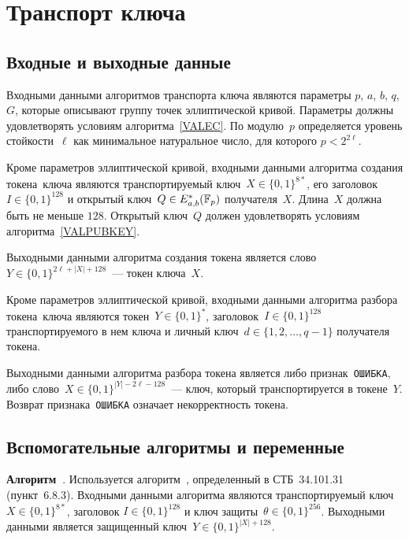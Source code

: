 \section{Транспорт ключа}\label{TRANSPORT}

\subsection{Входные и выходные данные}\label{TRANSPORT.InOut}
	
Входными данными алгоритмов транспорта ключа являются 
параметры $p$, $a$, $b$, $q$, $G$, которые описывают группу 
точек эллиптической кривой.
Параметры должны удовлетворять условиям алгоритма~\ref{VALEC}.
По модулю~$p$ определяется уровень стойкости~$\ell$ как минимальное 
натуральное число, для которого $p<2^{2\ell}$.

Кроме параметров эллиптической кривой,
входными данными алгоритма создания токена~ключа являются
транспортируемый ключ~$X\in\{0,1\}^{8*}$,
его заголовок~$I\in\{0,1\}^{128}$
и открытый ключ~$Q\in E_{a,b}^*(\mathbb{F}_p)$ получателя~$X$.
%
Длина~$X$ должна быть не меньше $128$.
%
Открытый ключ~$Q$ должен удовлетворять условиям 
алгоритма~\ref{VALPUBKEY}.

Выходными данными алгоритма создания токена является 
слово $Y\in\{0,1\}^{2\ell+|X|+128}$~--- токен ключа~$X$.

Кроме параметров эллиптической кривой,
входными данными алгоритма разбора токена~ключа являются 
токен~$Y\in\{0,1\}^*$,
заголовок~$I\in\{0,1\}^{128}$ транспортируемого в нем ключа
и личный ключ~$d\in\{1,2,\ldots,q-1\}$ получателя токена.

Выходными данными алгоритма разбора токена 
является либо признак~\texttt{ОШИБКА},
либо слово~$X\in\{0,1\}^{|Y|-2\ell-128}$~---
ключ, который транспортируется в токене~$Y$.
%
Возврат признака~\texttt{ОШИБКА} означает некорректность токена.

\subsection{Вспомогательные алгоритмы и переменные}
\label{TRANSPORT.Aux}

{\bf Алгоритм~}.
Используется алгоритм~,
определенный в СТБ~34.101.31 (пункт~6.8.3).
Входными данными алгоритма являются
транспортируемый ключ~$X\in\{0,1\}^{8*}$, заголовок $I\in\{0,1\}^{128}$
и ключ защиты~$\theta\in\{0,1\}^{256}$.
Выходными данными является
защищенный ключ~$Y\in\{0,1\}^{|X|+128}$.

